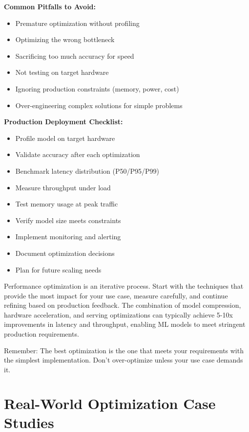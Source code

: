 \textbf{Common Pitfalls to Avoid:}

\begin{itemize}
    \item Premature optimization without profiling
    \item Optimizing the wrong bottleneck
    \item Sacrificing too much accuracy for speed
    \item Not testing on target hardware
    \item Ignoring production constraints (memory, power, cost)
    \item Over-engineering complex solutions for simple problems
\end{itemize}

\textbf{Production Deployment Checklist:}

\begin{itemize}
    \item[\checkmark] Profile model on target hardware
    \item[\checkmark] Validate accuracy after each optimization
    \item[\checkmark] Benchmark latency distribution (P50/P95/P99)
    \item[\checkmark] Measure throughput under load
    \item[\checkmark] Test memory usage at peak traffic
    \item[\checkmark] Verify model size meets constraints
    \item[\checkmark] Implement monitoring and alerting
    \item[\checkmark] Document optimization decisions
    \item[\checkmark] Plan for future scaling needs
\end{itemize}

Performance optimization is an iterative process. Start with the techniques that provide the most impact for your use case, measure carefully, and continue refining based on production feedback. The combination of model compression, hardware acceleration, and serving optimizations can typically achieve 5-10x improvements in latency and throughput, enabling ML models to meet stringent production requirements.

Remember: The best optimization is the one that meets your requirements with the simplest implementation. Don't over-optimize unless your use case demands it.

\section{Real-World Optimization Case Studies}


